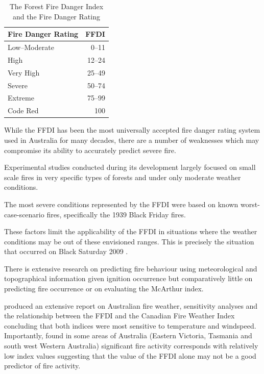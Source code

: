 \documentclass[11pt,a4paper]{article}
\begin{document}
\begin{table}
  \centering
  \begin{tabular}{lr}
    \toprule
    Fire Danger Rating & FFDI \\
    \midrule
    Low--Moderate      & 0--11 \\
    High               & 12--24 \\
    Very High          & 25--49\\
    Severe             & 50--74\\
    Extreme            & 75--99 \\
    Code Red           & 100\rlap{+} \\
    \bottomrule
  \end{tabular}
  \caption{The Forest Fire Danger Index and the Fire Danger Rating}
  \label{table:FDR}
\end{table}

While the FFDI has been the most universally accepted fire danger rating system used in Australia for many decades, there are a number of weaknesses which may compromise its ability to accurately predict severe fire.
\begin{compactenum}
  \item Experimental studies conducted during its development largely focused on small scale fires in very specific types of forests and under only moderate weather conditions.
  \item The most severe conditions represented by the FFDI were based on known worst-case-scenario fires, specifically the 1939 Black Friday fires.
\end{compactenum}
These factors limit the applicability of the FFDI in situations where the weather conditions may be out of these envisioned ranges. This is precisely the situation that occurred on Black Saturday 2009 \citep{harris12}.

There is extensive research on predicting fire behaviour using meteorological and topographical information given ignition occurrence but comparatively little on  predicting fire occurrence or on evaluating the McArthur index.

\citet{dowdy10} produced an extensive report on Australian fire weather, sensitivity analyses and the relationship between the FFDI and the Canadian Fire Weather Index concluding that both indices were most sensitive to temperature and windspeed. Importantly, \citet{dowdy10} found in some areas of Australia (Eastern Victoria, Tasmania and south west Western Australia) significant fire activity corresponds with relatively low index values suggesting that the value of the FFDI alone may not be a good predictor of fire activity.
\end{document}
